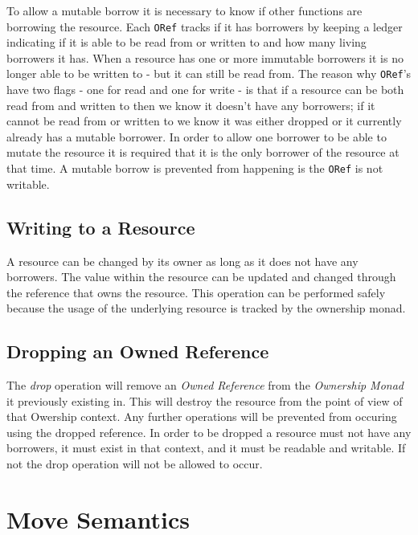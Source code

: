 \documentclass[onehalf,11pt]{beavtex}
\begin{document}
To allow a mutable borrow it is necessary to know if other functions are
borrowing the resource.  Each \texttt{ORef} tracks if it has borrowers by keeping a
ledger indicating if it is able to be read from or written to and how many
living borrowers it has.  When a resource has one or more immutable borrowers it
is no longer able to be written to - but it can still be read from.
The reason why \texttt{ORef}'s have two flags - one for read and one for write - is that
if a resource can be both read from and written to then we know it doesn't have
any borrowers; if it cannot be read from or written to we know it was either
dropped or it currently already has a mutable borrower.
In order to allow one borrower to be able to mutate the resource it is required
that it is the only borrower of the resource at that time. %
A mutable borrow is prevented from happening is the \texttt{ORef} is not writable.


\subsection{Writing to a Resource}

A resource can be changed by its owner as long as it does not have any borrowers.
The value within the resource can be updated and changed through the reference
that owns the resource. This operation can be performed safely because the usage
of the underlying resource is tracked by the ownership monad.

\subsection{Dropping an Owned Reference}

The \textit{drop} operation will remove an \textit{Owned Reference} from the
\textit{Ownership Monad} it previously existing in. This will destroy the
resource from the point of view of that Owership context. Any further operations
will be prevented from occuring using the dropped reference. In order to be
dropped a resource must not have any borrowers, it must exist in that context,
and it must be readable and writable. If not the drop operation will not be
allowed to occur.


\section{Move Semantics}
\end{document}

